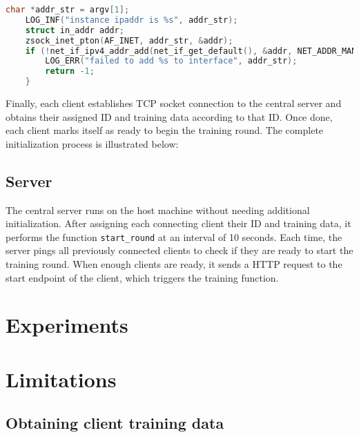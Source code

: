 \documentclass[12pt]{article}
\begin{document}
\begin{lstlisting}[language=C, caption=the "run" function which performs IP address assignment at runtime]
    char *addr_str = argv[1];
    LOG_INF("instance ipaddr is %s", addr_str);
    struct in_addr addr;
    zsock_inet_pton(AF_INET, addr_str, &addr);
    if (!net_if_ipv4_addr_add(net_if_get_default(), &addr, NET_ADDR_MANUAL, UINT32_MAX)) {
        LOG_ERR("failed to add %s to interface", addr_str);
        return -1;
    }
\end{lstlisting}

Finally, each client establishes TCP socket connection to the central server and obtains
their assigned ID and training data according to that ID. Once done, each client
marks itself as ready to begin the training round. The complete initialization process is
illustrated below:

\subsection{Server}
The central server runs on the host machine without needing additional initialization. After
assigning each connecting client their ID and training data, it performs the function
\verb|start_round| at an interval of 10 seconds. Each time, the server pings all previously
connected clients to check if they are ready to start the training round. When enough clients are
ready, it sends a HTTP request to the start endpoint of the client, which triggers the training
function.
\section{Experiments}
\section{Limitations}
\subsection{Obtaining client training data}
\end{document}
